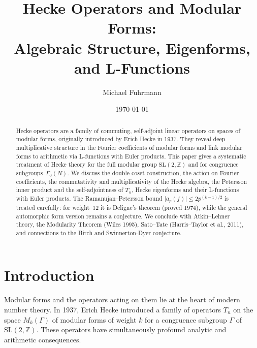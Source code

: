 \documentclass[12pt,a4paper]{amsart}
\author{Michael Fuhrmann}
\date{\today}
\theoremstyle{definition}
\begin{document}
\title{Hecke Operators and Modular Forms:\\
Algebraic Structure, Eigenforms, and L-Functions}

\begin{abstract}
Hecke operators are a family of commuting, self-adjoint linear operators on
spaces of modular forms, originally introduced by Erich Hecke in 1937. They
reveal deep multiplicative structure in the Fourier coefficients of modular
forms and link modular forms to arithmetic via L-functions with Euler products.
This paper gives a systematic treatment of Hecke theory for the full modular
group $\mathrm{SL}(2,\mathbb{Z})$ and for congruence subgroups~$\Gamma_0(N)$.
We discuss the double coset construction, the action on Fourier coefficients,
the commutativity and multiplicativity of the Hecke algebra, the Petersson
inner product and the self-adjointness of $T_n$, Hecke eigenforms and their
L-functions with Euler products. The Ramanujan--Petersson bound
$\lvert a_p(f) \rvert \le 2p^{(k-1)/2}$ is treated carefully: for weight~$12$
it is Deligne's theorem (proved 1974), while the general automorphic form
version remains a conjecture. We conclude with Atkin--Lehner theory, the
Modularity Theorem (Wiles 1995), Sato--Tate (Harris--Taylor et al., 2011),
and connections to the Birch and Swinnerton-Dyer conjecture.
\end{abstract}

\maketitle

\tableofcontents

\section{Introduction}

Modular forms and the operators acting on them lie at the heart of modern
number theory. In 1937, Erich Hecke introduced a family of operators $T_n$
on the space $M_k(\Gamma)$ of modular forms of weight $k$ for a congruence
subgroup $\Gamma$ of $\mathrm{SL}(2,\mathbb{Z})$. These operators have
simultaneously profound analytic and arithmetic consequences.
\end{document}
